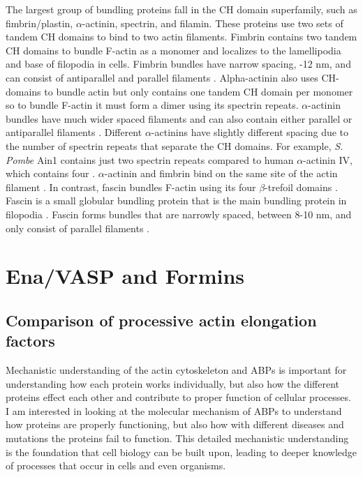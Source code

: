 The largest group of bundling proteins fall in the CH domain superfamily, such as fimbrin/plastin, $\alpha$-actinin, spectrin, and filamin. These proteins use two sets of tandem CH domains to bind to two actin filaments. Fimbrin contains two tandem CH domains to bundle F-actin as a monomer and localizes to the lamellipodia and base of filopodia in cells. Fimbrin bundles have narrow spacing, -12 nm, and can consist of antiparallel and parallel filaments \citep{hanein_atomic_1998}. Alpha-actinin also uses CH-domains to bundle actin but only contains one tandem CH domain per monomer so to bundle F-actin it must form a dimer using its spectrin repeats. $\alpha$-actinin bundles have much wider spaced filaments and can also contain either parallel or antiparallel filaments \citep{sjoblom_alpha-actinin_2008}. Different $\alpha$-actinins have slightly different spacing due to the number of spectrin repeats that separate the CH domains. For example, \textit{S. Pombe} Ain1 contains just two spectrin repeats compared to human $\alpha$-actinin IV, which contains four \citep{murphy_actinin_2015}. $\alpha$-actinin and fimbrin bind on the same site of the actin filament \citep{klein_2004}. In contrast, fascin bundles F-actin using its four $\beta$-trefoil domains \citep{jansen_mechanism_2011}. Fascin is a small globular bundling protein that is the main bundling protein in filopodia \citep{vignjevic_role_2006,mellor_role_2010}. Fascin forms bundles that are narrowly spaced, between 8-10 nm, and only consist of parallel filaments \citep{edwards_fascins_1995,jansen_mechanism_2011,cant_drosophila_1994}. 

\section[Ena/VASP and Formins]{Ena/VASP and Formins\footnotemark}\label{ena-formin-review}


\subsection{Comparison of processive actin elongation factors}

Mechanistic understanding of the actin cytoskeleton and ABPs is important for understanding how each protein works individually, but also how the different proteins effect each other and contribute to proper function of cellular processes. I am interested in looking at the molecular mechanism of ABPs to understand how proteins are properly functioning, but also how with different diseases and mutations the proteins fail to function. This detailed mechanistic understanding is the foundation that cell biology can be built upon, leading to deeper knowledge of processes that occur in cells and even organisms. 

